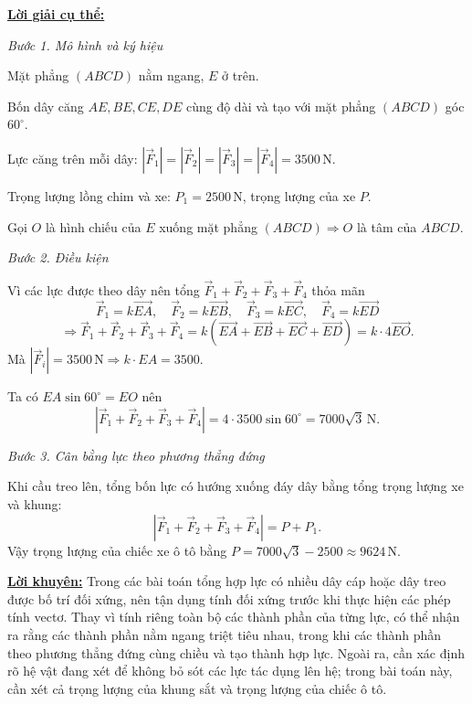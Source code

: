 \documentclass[12pt,a4paper,oneside]{book}
\theoremstyle{theorem}
\theoremstyle{definition}
\begin{document}
        \noindent \underline{\textbf{Lời giải cụ thể:}}

            \noindent \textit{Bước 1. Mô hình và ký hiệu}
            
            Mặt phẳng $(ABCD)$ nằm ngang, $E$ ở trên.
            
            Bốn dây căng $AE,BE,CE,DE$ cùng độ dài và tạo với mặt phẳng $(ABCD)$ góc $60^\circ$.
            
            Lực căng trên mỗi dây:
            $|\vec{F}_1|=|\vec{F}_2|=|\vec{F}_3|=|\vec{F}_4|=3500\,\mathrm{N}$.
            
            Trọng lượng lồng chim và xe: $P_1=2500\,\mathrm{N}$, trọng lượng của xe $P$.
            
            Gọi $O$ là hình chiếu của $E$ xuống mặt phẳng $(ABCD)\Rightarrow O$ là tâm của $ABCD$.
            
    \noindent \textit{Bước 2. Điều kiện}
            
            Vì các lực được theo dây nên tổng $\vec{F}_1+\vec{F}_2+\vec{F}_3+\vec{F}_4$ thỏa mãn
            $$
            \vec{F}_1=k\vec{EA},\quad
            \vec{F}_2=k\vec{EB},\quad
            \vec{F}_3=k\vec{EC},\quad
            \vec{F}_4=k\vec{ED}
            $$
            $$
            \Rightarrow
            \vec{F}_1+\vec{F}_2+\vec{F}_3+\vec{F}_4
            =k(\vec{EA}+\vec{EB}+\vec{EC}+\vec{ED})
            =k\cdot4\vec{EO}.
            $$
            Mà $|\vec{F}_i|=3500\,\mathrm{N}\Rightarrow k\cdot EA=3500$.
            
            Ta có $EA\sin60^\circ=EO$ nên
            $$
            |\vec{F}_1+\vec{F}_2+\vec{F}_3+\vec{F}_4|
            =4\cdot3500\sin60^\circ
            =7000\sqrt{3}\,\mathrm{N}.
            $$
            
        \noindent \textit{Bước 3. Cân bằng lực theo phương thẳng đứng}
            
            Khi cầu treo lên, tổng bốn lực có hướng xuống đáy dây bằng tổng trọng lượng xe và khung:
            $$
            |\vec{F}_1+\vec{F}_2+\vec{F}_3+\vec{F}_4|
            =P+P_1.
            $$
            Vậy trọng lượng của chiếc xe ô tô bằng
            $ P=7000\sqrt{3}-2500\approx9624\,\mathrm{N}.$

        \noindent \underline{\textbf{Lời khuyên:}} Trong các bài toán tổng hợp lực có nhiều dây cáp hoặc dây treo được bố trí đối xứng, nên tận dụng tính đối xứng trước khi thực hiện các phép tính vectơ. Thay vì tính riêng toàn bộ các thành phần của từng lực, có thể nhận ra rằng các thành phần nằm ngang triệt tiêu nhau, trong khi các thành phần theo phương thẳng đứng cùng chiều và tạo thành hợp lực. Ngoài ra, cần xác định rõ hệ vật đang xét để không bỏ sót các lực tác dụng lên hệ; trong bài toán này, cần xét cả trọng lượng của khung sắt và trọng lượng của chiếc ô tô.
              
\end{document}
